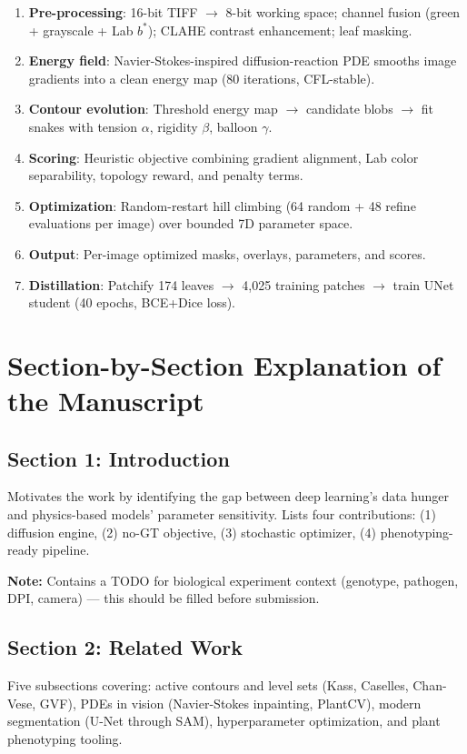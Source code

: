 \documentclass[11pt,a4paper]{article}
\begin{document}
\begin{enumerate}[nosep]
  \item \textbf{Pre-processing}: 16-bit TIFF $\to$ 8-bit working space; channel fusion (green + grayscale + Lab $b^*$); CLAHE contrast enhancement; leaf masking.
  \item \textbf{Energy field}: Navier-Stokes-inspired diffusion-reaction PDE smooths image gradients into a clean energy map (80 iterations, CFL-stable).
  \item \textbf{Contour evolution}: Threshold energy map $\to$ candidate blobs $\to$ fit snakes with tension $\alpha$, rigidity $\beta$, balloon $\gamma$.
  \item \textbf{Scoring}: Heuristic objective combining gradient alignment, Lab color separability, topology reward, and penalty terms.
  \item \textbf{Optimization}: Random-restart hill climbing (64 random + 48 refine evaluations per image) over bounded 7D parameter space.
  \item \textbf{Output}: Per-image optimized masks, overlays, parameters, and scores.
  \item \textbf{Distillation}: Patchify 174 leaves $\to$ 4,025 training patches $\to$ train UNet student (40 epochs, BCE+Dice loss).
\end{enumerate}

\section{Section-by-Section Explanation of the Manuscript}

\subsection{Section 1: Introduction}
Motivates the work by identifying the gap between deep learning's data hunger and physics-based models' parameter sensitivity.  Lists four contributions: (1) diffusion engine, (2) no-GT objective, (3) stochastic optimizer, (4) phenotyping-ready pipeline.

\textbf{Note:} Contains a TODO for biological experiment context (genotype, pathogen, DPI, camera) --- this should be filled before submission.

\subsection{Section 2: Related Work}
Five subsections covering: active contours and level sets (Kass, Caselles, Chan-Vese, GVF), PDEs in vision (Navier-Stokes inpainting, PlantCV), modern segmentation (U-Net through SAM), hyperparameter optimization, and plant phenotyping tooling.
\end{document}
